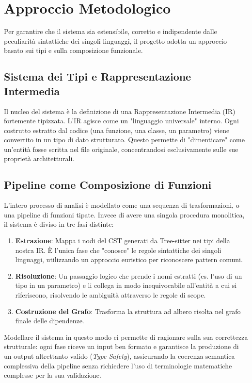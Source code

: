 \section{Approccio Metodologico}
Per garantire che il sistema sia estensibile, corretto e indipendente
dalle peculiarità sintattiche dei singoli linguaggi, il progetto
adotta un approccio basato sui tipi e sulla composizione funzionale.

\subsection{Sistema dei Tipi e Rappresentazione Intermedia}
Il nucleo del sistema è la definizione di una Rappresentazione
Intermedia (IR) fortemente tipizzata. L'IR agisce come un "linguaggio
universale" interno. Ogni costrutto estratto dal codice (una
funzione, una classe, un parametro) viene convertito in un tipo di
dato strutturato. Questo permette di "dimenticare" come un'entità
fosse scritta nel file originale, concentrandosi esclusivamente sulle
sue proprietà architetturali.

\subsection{Pipeline come Composizione di Funzioni}
L'intero processo di analisi è modellato come una sequenza di
trasformazioni, o una pipeline di funzioni tipate. Invece di avere
una singola procedura monolitica, il sistema è diviso in tre fasi distinte:
\begin{enumerate}
  \item \textbf{Estrazione}: Mappa i nodi del CST generati da
    Tree-sitter nei tipi della nostra IR. È l'unica fase che
    "conosce" le regole sintattiche dei singoli linguaggi,
    utilizzando un approccio euristico per riconoscere pattern comuni.
  \item \textbf{Risoluzione}: Un passaggio logico che prende i nomi
    estratti (es. l'uso di un tipo in un parametro) e li collega in
    modo inequivocabile all'entità a cui si riferiscono, risolvendo
    le ambiguità attraverso le regole di scope.
  \item \textbf{Costruzione del Grafo}: Trasforma la struttura ad
    albero risolta nel grafo finale delle dipendenze.
\end{enumerate}

Modellare il sistema in questo modo ci permette di ragionare sulla
sua correttezza strutturale: ogni fase riceve un input ben formato e
garantisce la produzione di un output altrettanto valido
(\textit{Type Safety}), assicurando la coerenza semantica complessiva
della pipeline senza richiedere l'uso di terminologie matematiche
complesse per la sua validazione.
